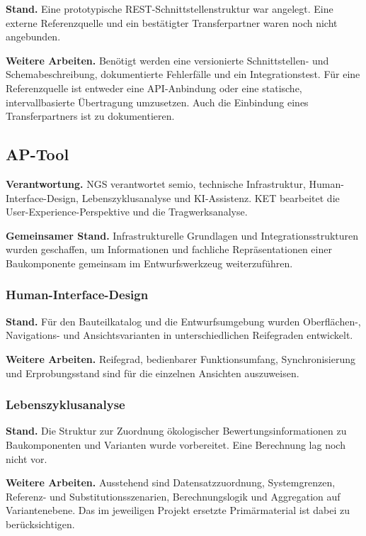 \documentclass[type=zwischenbericht,theme=dark]{zukunftbau}
\begin{document}
\textbf{Stand.} Eine prototypische REST-Schnittstellenstruktur war angelegt. Eine externe Referenzquelle und ein bestätigter Transferpartner waren noch nicht angebunden.

\textbf{Weitere Arbeiten.} Benötigt werden eine versionierte Schnittstellen- und Schemabeschreibung, dokumentierte Fehlerfälle und ein Integrationstest. Für eine Referenzquelle ist entweder eine API-Anbindung oder eine statische, intervallbasierte Übertragung umzusetzen. Auch die Einbindung eines Transferpartners ist zu dokumentieren.

\subsection{AP-Tool}

\textbf{Verantwortung.} NGS verantwortet semio, technische Infrastruktur, Human-Interface-Design, Lebenszyklusanalyse und KI-Assistenz. KET bearbeitet die User-Experience-Perspektive und die Tragwerksanalyse.

\textbf{Gemeinsamer Stand.} Infrastrukturelle Grundlagen und Integrationsstrukturen wurden geschaffen, um Informationen und fachliche Repräsentationen einer Baukomponente gemeinsam im Entwurfswerkzeug weiterzuführen.

\subsubsection{Human-Interface-Design}

\textbf{Stand.} Für den Bauteilkatalog und die Entwurfsumgebung wurden Oberflächen-, Navigations- und Ansichtsvarianten in unterschiedlichen Reifegraden entwickelt.

\textbf{Weitere Arbeiten.} Reifegrad, bedienbarer Funktionsumfang, Synchronisierung und Erprobungsstand sind für die einzelnen Ansichten auszuweisen.

\subsubsection{Lebenszyklusanalyse}

\textbf{Stand.} Die Struktur zur Zuordnung ökologischer Bewertungsinformationen zu Baukomponenten und Varianten wurde vorbereitet. Eine Berechnung lag noch nicht vor.

\textbf{Weitere Arbeiten.} Ausstehend sind Datensatzzuordnung, Systemgrenzen, Referenz- und Substitutionsszenarien, Berechnungslogik und Aggregation auf Variantenebene. Das im jeweiligen Projekt ersetzte Primärmaterial ist dabei zu berücksichtigen.
\end{document}

